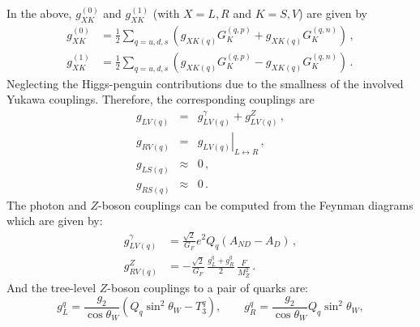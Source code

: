 \documentclass[prd,nofootinbib,preprint,superscriptaddress]{revtex4}
\begin{document}
In the above, $g_{XK}^{(0)}$ and $g_{XK}^{(1)}$ (with $X = L, R$ and $K = S, V$) are given by
\begin{align}
	g_{XK}^{(0)} &= \frac{1}{2} \sum_{q = u,d,s} \left( g_{XK(q)} G_K^{(q,p)} +
	g_{XK(q)} G_K^{(q,n)} \right)\,, \nonumber \\
	g_{XK}^{(1)} &= \frac{1}{2} \sum_{q = u,d,s} \left( g_{XK(q)} G_K^{(q,p)} - 
	g_{XK(q)} G_K^{(q,n)} \right)\,.
\end{align}
Neglecting the Higgs-penguin contributions due to the smallness of the
involved Yukawa couplings. Therefore, the corresponding couplings are
\begin{eqnarray}
	g_{LV(q)} &=& g_{LV(q)}^{\gamma} + g_{LV(q)}^{Z}\,, \nonumber \\
	g_{RV(q)} &=& \left. g_{LV(q)} \right|_{L \leftrightarrow R}\,, \nonumber \\
	g_{LS(q)} &\approx& 0 \, , \nonumber \\ 
	g_{RS(q)} &\approx& 0 \, .
\end{eqnarray}
The photon and $Z$-boson couplings can be computed from the Feynman
diagrams which are given by:
\begin{align}
	g_{LV(q)}^{\gamma} &= \frac{\sqrt{2}}{G_F} e^2 Q_q 
	\left(A_{ND} - A_D \right)\,, \nonumber \\
	g_{RV(q)}^{Z} &= -\frac{\sqrt{2}}{G_F} \, \frac{g_L^q + g_R^q}{2} \, 
	\frac{F}{M_Z^2} \,. 
\end{align}
And the tree-level $Z$-boson couplings to a pair of quarks are:
\begin{equation}
	g_L^q = \frac{g_2}{\cos \theta_W}\left( Q_q \sin^2 \theta_W - T_3^q
	\right), \qquad g_R^q = \frac{g_2}{\cos \theta_W} Q_q \sin^2 \theta_W,
\end{equation}
\end{document}
